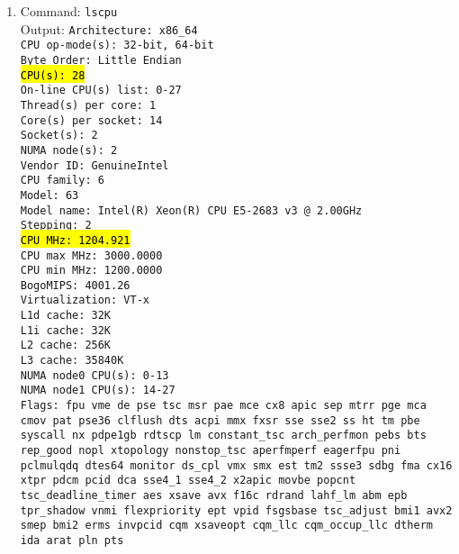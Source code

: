 \documentclass[11pt]{article}
\begin{document}
\begin{enumerate}
\item Command: {\tt lscpu} \\

	  Output:  {\tt Architecture:          x86\_64\\
CPU op-mode(s):        32-bit, 64-bit\\
Byte Order:            Little Endian\\
\hl{CPU(s):            28}\\
On-line CPU(s) list:   0-27\\
Thread(s) per core:    1\\
Core(s) per socket:    14\\
Socket(s):             2\\
NUMA node(s):          2\\
Vendor ID:             GenuineIntel\\
CPU family:            6\\
Model:                 63\\
Model name:            Intel(R) Xeon(R) CPU E5-2683 v3 @ 2.00GHz\\
Stepping:              2\\
\hl{CPU MHz:               1204.921}\\
CPU max MHz:           3000.0000\\
CPU min MHz:           1200.0000\\
BogoMIPS:              4001.26\\
Virtualization:        VT-x\\
L1d cache:             32K\\
L1i cache:             32K\\
L2 cache:              256K\\
L3 cache:              35840K\\
NUMA node0 CPU(s):     0-13\\
NUMA node1 CPU(s):     14-27\\
Flags:                 fpu vme de pse tsc msr pae mce cx8 apic sep mtrr pge mca cmov pat pse36 clflush dts acpi mmx fxsr sse sse2 ss ht tm pbe syscall nx pdpe1gb rdtscp lm constant\_tsc arch\_perfmon pebs bts rep\_good nopl xtopology nonstop\_tsc aperfmperf eagerfpu pni pclmulqdq dtes64 monitor ds\_cpl vmx smx est tm2 ssse3 sdbg fma cx16 xtpr pdcm pcid dca sse4\_1 sse4\_2 x2apic movbe popcnt tsc\_deadline\_timer aes xsave avx f16c rdrand lahf\_lm abm epb tpr\_shadow vnmi flexpriority ept vpid fsgsbase tsc\_adjust bmi1 avx2 smep bmi2 erms invpcid cqm xsaveopt cqm\_llc cqm\_occup\_llc dtherm ida arat pln pts\\

}
\end{enumerate}
\end{document}
